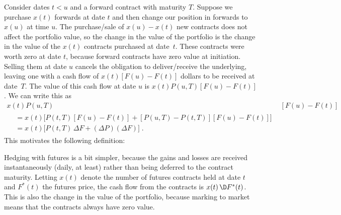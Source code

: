 Consider dates $t<u$ and a forward contract with maturity $T$.  Suppose we purchase $x(t)$ forwards at date $t$ and then change our position in forwards to $x(u)$ at time $u$.    The purchase/sale of $x(u)-x(t)$ new contracts does not affect the portfolio value, so the change in the value of the portfolio is the change in the value of the $x(t)$ contracts purchased at date~$t$.  These contracts were worth zero at date $t$, because forward contracts have zero value at initiation.  Selling them at date $u$ cancels the obligation to deliver/receive the underlying, leaving one with a cash flow of $x(t)[F(u)-F(t)]$ dollars to be received at date~$T$.  The value of this cash flow at date $u$ is $x(t)P(u,T)[F(u)-F(t)]$.  We can write this as
\begin{align*}
x(t)P(u,T)&[F(u)-F(t)]  \\\begin{split}&= x(t)\big[P(t,T)[F(u)-F(t)] + [P(u,T)-P(t,T)][F(u)-F(t)]\big]\\
&= x(t)\big[P(t,T)\,\varDelta F + (\varDelta P)(\varDelta F)\big]\;.
\end{split}
\end{align*}
This motivates the following definition:


Hedging with futures is a bit simpler, because the gains and losses are received instantaneously (daily, at least) rather than being deferred to the contract maturity.  Letting $x(t)$ denote the number of futures contracts held at date $t$ and $F^*(t)$ the futures price, the cash flow from the contracts is $x(t)\,\D F^*(t)$.  This is also the change in the value of the portfolio, because marking to market means that the contracts always have zero value.  

